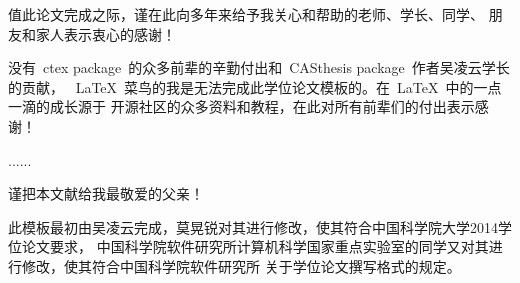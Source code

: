 
\begin{thanks}

值此论文完成之际，谨在此向多年来给予我关心和帮助的老师、学长、同学、
朋友和家人表示衷心的感谢！

没有~ctex package~的众多前辈的辛勤付出和~CASthesis package~作者吴凌云学长的贡献，
~\LaTeX{}~菜鸟的我是无法完成此学位论文模板的。在~\LaTeX{}~中的一点一滴的成长源于
开源社区的众多资料和教程，在此对所有前辈们的付出表示感谢！

......

\vskip 18pt

谨把本文献给我最敬爱的父亲！

\vskip 18pt

此模板最初由吴凌云完成，莫晃锐对其进行修改，使其符合中国科学院大学2014学位论文要求，
中国科学院软件研究所计算机科学国家重点实验室的同学又对其进行修改，使其符合中国科学院软件研究所
关于学位论文撰写格式的规定。

\end{thanks}
